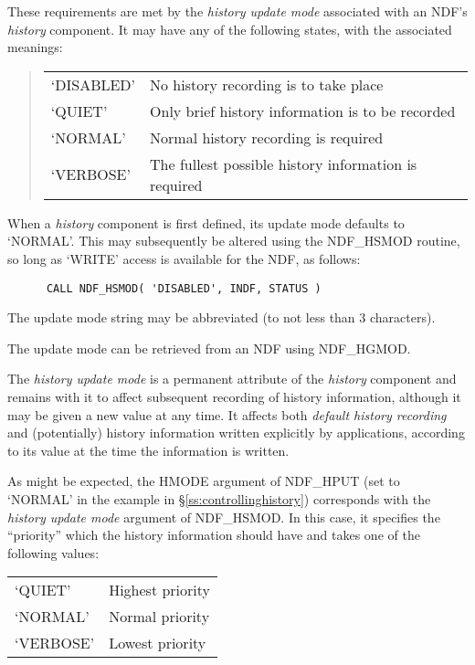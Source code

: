 \documentclass[twoside,11pt]{article}
\newcommand{\htmlref}[2]{#1}
\newcommand{\st}[1]{{\em{#1}}}
\begin{document}
These requirements are met by the \st{history update mode\/} associated
with an NDF's \st{history\/} component. It may have any of the
following states, with the associated meanings:

\begin{quote}
\begin{center}
\begin{tabular}{ll}
`DISABLED' & No history recording is to take place\\
`QUIET' & Only brief history information is to be recorded\\
`NORMAL' & Normal history recording is required\\
`VERBOSE' & The fullest possible history information is required
\end{tabular}
\end{center}
\end{quote}

When a \st{history\/} component is first defined, its update mode
defaults to `NORMAL'. This may subsequently be altered using the
\htmlref{NDF\_HSMOD}{NDF_HSMOD} routine, so long as `WRITE' access is available for the
NDF, as follows:

\small
\begin{verbatim}
      CALL NDF_HSMOD( 'DISABLED', INDF, STATUS )
\end{verbatim}
\normalsize

The update mode string may be abbreviated (to not less than 3 characters).

The update mode can be retrieved from an NDF using
\htmlref{NDF\_HGMOD}{NDF_HGMOD}.

The \st{history update mode\/} is a permanent attribute of the
\st{history\/} component and remains with it to affect subsequent
recording 
of history information, although it may be given a new value at any
time.  It affects both \st{default history recording\/} and (potentially)
history information written explicitly by applications, according to
its value at the time the information is written.

As might be expected, the HMODE argument of \htmlref{NDF\_HPUT}{NDF_HPUT} (set to `NORMAL'
in the example in \S\ref{ss:controllinghistory}) corresponds with the
\st{history update mode\/} argument of NDF\_HSMOD. In this case, it
specifies the ``priority'' which the history information should have
and takes one of the following values:

\begin{center}
\begin{tabular}{ll}
`QUIET' & Highest priority\\
`NORMAL' & Normal priority\\
`VERBOSE' & Lowest priority
\end{tabular}
\end{center}
\end{document}
